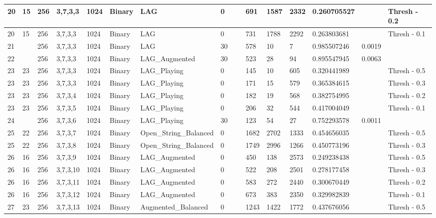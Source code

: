 \documentclass[conference]{IEEEtran}
\begin{document}
\begin{table}[!ht]
\begin{adjustbox}{width=\textwidth}
\begin{tabular}{|l|l|l|l|l|l|l|l|l|l|l|l|l|l|l|}
        20 & 15 & 256 & 3,7,3,3 & 1024 & Binary & LAG & 0 & ~ & 691 & 1587 & 2332 & 0.260705527 & ~ & Thresh - 0.2 \\ \hline
        20 & 15 & 256 & 3,7,3,3 & 1024 & Binary & LAG & 0 & ~ & 731 & 1788 & 2292 & 0.263803681 & ~ & Thresh - 0.1 \\ \hline
        21 & ~ & 256 & 3,7,3,3 & 1024 & Binary & LAG & 30 & ~ & 578 & 10 & 7 & 0.985507246 & 0.0019 & ~ \\ \hline
        22 & ~ & 256 & 3,7,3,3 & 1024 & Binary & LAG\_Augmented & 30 & ~ & 523 & 28 & 94 & 0.895547945 & 0.0063 & ~ \\ \hline
        23 & 23 & 256 & 3,7,3,3 & 1024 & Binary & LAG\_Playing & 0 & ~ & 145 & 10 & 605 & 0.320441989 & ~ & Thresh - 0.5 \\ \hline
        23 & 23 & 256 & 3,7,3,3 & 1024 & Binary & LAG\_Playing & 0 & ~ & 171 & 15 & 579 & 0.365384615 & ~ & Thresh - 0.3 \\ \hline
        23 & 23 & 256 & 3,7,3,4 & 1024 & Binary & LAG\_Playing & 0 & ~ & 182 & 19 & 568 & 0.382754995 & ~ & Thresh - 0.2 \\ \hline
        23 & 23 & 256 & 3,7,3,5 & 1024 & Binary & LAG\_Playing & 0 & ~ & 206 & 32 & 544 & 0.417004049 & ~ & Thresh - 0.1 \\ \hline
        24 & ~ & 256 & 3,7,3,6 & 1024 & Binary & LAG\_Playing & 30 & ~ & 123 & 54 & 27 & 0.752293578 & 0.0011 & ~ \\ \hline
        25 & 22 & 256 & 3,7,3,7 & 1024 & Binary & Open\_String\_Balanced & 0 & ~ & 1682 & 2702 & 1333 & 0.454656035 & ~ & Thresh - 0.5 \\ \hline
        25 & 22 & 256 & 3,7,3,8 & 1024 & Binary & Open\_String\_Balanced & 0 & ~ & 1749 & 2996 & 1266 & 0.450773196 & ~ & Thresh - 0.3 \\ \hline
        26 & 16 & 256 & 3,7,3,9 & 1024 & Binary & LAG\_Augmented & 0 & ~ & 450 & 138 & 2573 & 0.249238438 & ~ & Thresh - 0.5 \\ \hline
        26 & 16 & 256 & 3,7,3,10 & 1024 & Binary & LAG\_Augmented & 0 & ~ & 522 & 208 & 2501 & 0.278177458 & ~ & Thresh - 0.3 \\ \hline
        26 & 16 & 256 & 3,7,3,11 & 1024 & Binary & LAG\_Augmented & 0 & ~ & 583 & 272 & 2440 & 0.300670449 & ~ & Thresh - 0.2 \\ \hline
        26 & 16 & 256 & 3,7,3,12 & 1024 & Binary & LAG\_Augmented & 0 & ~ & 673 & 383 & 2350 & 0.329982839 & ~ & Thresh - 0.1 \\ \hline
        27 & 23 & 256 & 3,7,3,13 & 1024 & Binary & Augmented\_Balanced & 0 & ~ & 1243 & 1422 & 1772 & 0.437676056 & ~ & Thresh - 0.5 \\ \hline

\end{tabular}
\end{adjustbox}
\end{table}
\end{document}
